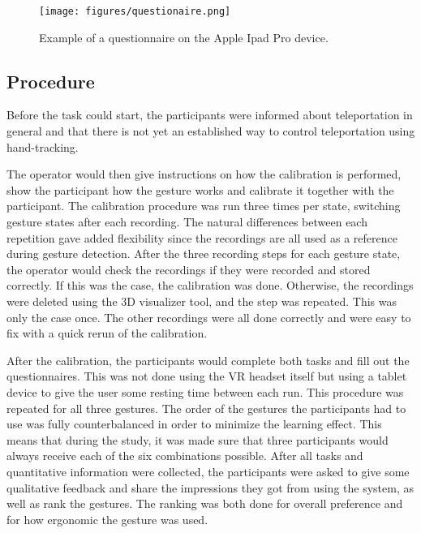 \begin{figure}[!ht]
    \centering
    \texttt{[image: figures/questionaire.png]}
    \caption{Example of a questionnaire on the Apple Ipad Pro device.}
    \label{fig:Ipad}
\end{figure}

\subsection{Procedure}
Before the task could start, the participants were informed about teleportation in general and that there is not yet an established way to control teleportation using hand-tracking.

The operator would then give instructions on how the calibration is performed, show the participant how the gesture works and calibrate it together with the participant. The calibration procedure was run three times per state, switching gesture states after each recording. The natural differences between each repetition gave added flexibility since the recordings are all used as a reference during gesture detection. After the three recording steps for each gesture state, the operator would check the recordings if they were recorded and stored correctly. If this was the case, the calibration was done. Otherwise, the recordings were deleted using the 3D visualizer tool, and the step was repeated. This was only the case once. The other recordings were all done correctly and were easy to fix with a quick rerun of the calibration. 

After the calibration, the participants would complete both tasks and fill out the questionnaires. This was not done using the VR headset itself but using a tablet device to give the user some resting time between each run. This procedure was repeated for all three gestures. 
The order of the gestures the participants had to use was fully counterbalanced in order to minimize the learning effect. This means that during the study, it was made sure that three participants would always receive each of the six combinations possible. 
After all tasks and quantitative information were collected, the participants were asked to give some qualitative feedback and share the impressions they got from using the system, as well as rank the gestures. The ranking was both done for overall preference and for how ergonomic the gesture was used.   


